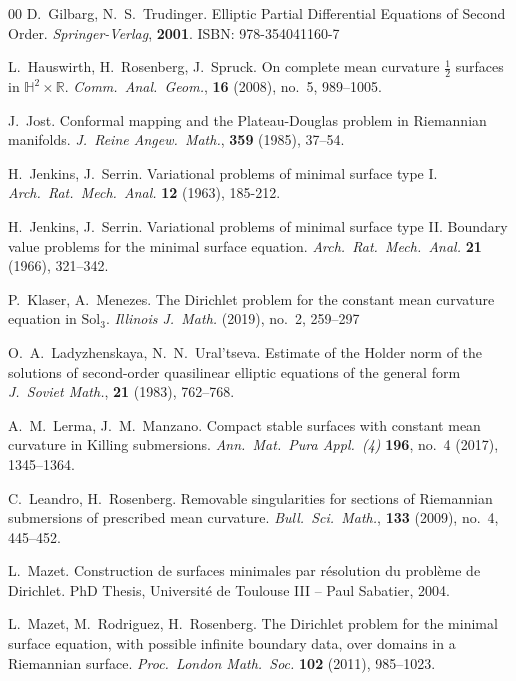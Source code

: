\documentclass[a4paper,10pt,reqno]{amsart}
\newcommand{\R}{\mathbb{R}}
\theoremstyle{definition}
\theoremstyle{remark}
\numberwithin{equation}{section}
\begin{document}
\begin{thebibliography}{00}
	 D.\ Gilbarg, N.\ S.\ Trudinger.
	\newblock Elliptic Partial Differential Equations of Second Order.
	\newblock \emph{Springer-Verlag}, \textbf{2001}. ISBN: 978-354041160-7
		
	 L.\ Hauswirth, H.\ Rosenberg, J.\ Spruck.
	\newblock On complete mean curvature $\frac{1}{2}$ surfaces in $\mathbb{H}^2\times\R$.
	\newblock \emph{Comm.\ Anal.\ Geom.}, \textbf{16} (2008), no.\ 5, 989--1005.
			
	 J.\ Jost.
	\newblock Conformal mapping and the Plateau-Douglas problem in Riemannian manifolds.
	\newblock \emph{J.\ Reine Angew.\ Math.}, \textbf{359} (1985), 37--54.

	 H.\ Jenkins, J.\ Serrin.
	\newblock Variational problems of minimal surface type I. 
	\newblock \emph{Arch.\ Rat.\ Mech.\ Anal.} \textbf{12} (1963), 185-212.

	 H.\ Jenkins, J.\ Serrin.
	\newblock Variational problems of minimal surface type II. Boundary value problems for the minimal surface equation.
	\newblock \emph{Arch.\ Rat.\ Mech.\ Anal.} \textbf{21} (1966), 321--342.
		
	 P.\ Klaser, A.\ Menezes.
	\newblock The Dirichlet problem for the constant mean curvature equation in $\mathrm{Sol}_3$.
	\newblock \emph{Illinois J.\ Math.}  (2019), no.\ 2, 259--297 

	 O.\ A.\ Ladyzhenskaya, N.\ N.\ Ural'tseva.
	\newblock Estimate of the Holder norm of the solutions of second-order quasilinear elliptic equations of the general form
	\newblock\emph{J.\ Soviet Math.}, \textbf{21} (1983), 762--768.
		
	 A.\ M.\ Lerma, J.\ M.\ Manzano.
	\newblock Compact stable surfaces with constant mean curvature in Killing submersions.
	\newblock \emph{Ann.\ Mat.\ Pura Appl.\ (4)}  \textbf{196}, no.\ 4 (2017), 1345--1364.
		
	 C.\ Leandro, H.\ Rosenberg.
	\newblock Removable singularities for sections of Riemannian submersions of prescribed mean curvature.
	\newblock\emph{Bull.\ Sci.\ Math.}, \textbf{133} (2009), no.\ 4, 445--452.
			
	 L.\ Mazet.
	\newblock Construction de surfaces minimales par résolution du problème de Dirichlet.
	\newblock PhD Thesis, Université de Toulouse III -- Paul Sabatier, 2004.
		
	 L.\ Mazet, M.\ Rodriguez, H.\ Rosenberg.
	\newblock The Dirichlet problem for the minimal surface equation, with possible infinite boundary data, over domains in a Riemannian surface.
	\newblock \emph{Proc.\ London Math.\ Soc.} \textbf{102} (2011), 985--1023.
				

\end{thebibliography}
\end{document}
